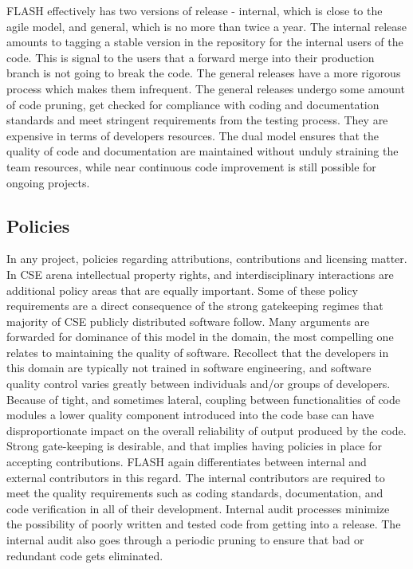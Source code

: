 FLASH effectively has two versions of release - internal, which
is close to the agile model, and general, which is no more than twice
a year. The internal release amounts to tagging a stable version in
the repository for the internal users of the code. This is signal to
the users that a forward merge into their production branch is not
going to break the code. The general releases have a more rigorous
process which makes them infrequent. The general releases undergo some
amount of code pruning, get checked for compliance with coding and
documentation standards and meet stringent requirements from the testing
process. They are expensive in terms of developers resources. The
dual model ensures that the quality of code and documentation are
maintained without unduly straining the team resources, while
near continuous code improvement is still possible for ongoing
projects. 
 
\subsection{Policies}
\label{sec:FLASHPolicies}
In any project, policies regarding attributions, contributions and
licensing matter. In CSE arena intellectual property rights,
and interdisciplinary interactions are additional policy
areas that are equally important. Some of these policy requirements
are a direct consequence of the strong gatekeeping regimes that
majority of CSE publicly distributed software follow.  Many arguments
are forwarded for dominance of this model in the domain, the
most compelling one relates to maintaining the quality of
software. Recollect that the developers in this domain are typically
not trained in software engineering, and software quality control
varies greatly between individuals and/or groups of
developers. Because of tight, and sometimes lateral, coupling between
functionalities of code modules a lower quality component introduced
into the code base can have disproportionate impact on the overall
reliability of output produced by the code. Strong gate-keeping is
desirable, and that implies having policies in place for accepting
contributions. FLASH again differentiates between internal and
external contributors in this regard. The internal contributors are
required to meet the quality requirements such as coding standards,
documentation, and code verification in all of their
development. Internal audit processes minimize the possibility of
poorly written and tested code from getting into a release. The internal audit also goes
through a periodic pruning to ensure that bad or redundant code gets
eliminated.  

